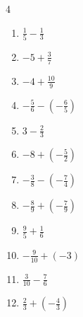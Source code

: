 \begin{multicols}{4}
\begin{enumerate}
  \item $\displaystyle \frac{1}{5} - \frac{1}{3}$


  \item $\displaystyle -5 + \frac{3}{7}$


  \item $\displaystyle -4 + \frac{10}{9}$


  \item $\displaystyle -\frac{5}{6} - \left(-\frac{6}{5}\right)$


  \item $\displaystyle 3 - \frac{2}{3}$


\columnbreak %

\resetques

  \item $\displaystyle -8 + \left(-\frac{5}{2}\right)$


  \item $\displaystyle -\frac{3}{8} - \left(-\frac{7}{4}\right)$


  \item $\displaystyle -\frac{8}{9} + \left(-\frac{7}{9}\right)$


  \item $\displaystyle \frac{9}{5} + \frac{1}{6}$


  \item $\displaystyle -\frac{9}{10} + \left(-3\right)$


  \item $\displaystyle \frac{3}{10} - \frac{7}{6}$


  \item $\displaystyle \frac{2}{3} + \left(-\frac{4}{3}\right)$


\end{enumerate}
\end{multicols}
